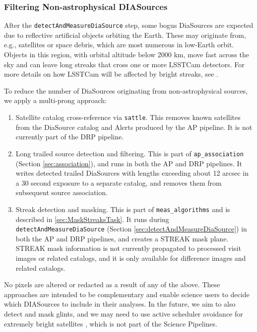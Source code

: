 \subsubsection{Filtering Non-astrophysical DIASources}
\label{sec:streaks}

After the \texttt{detectAndMeasureDiaSource} step, some bogus DiaSources are expected due to reflective artificial objects orbiting the Earth.
These may originate from, e.g., satellites or space debris, which are most numerous in low-Earth orbit.
Objects in this region, with orbital altitude below 2000 km, move fast across the sky and can leave long streaks that cross one or more LSSTCam detectors.
For more details on how LSSTCam will be affected by bright streaks, see \citet{2020AJ....160..226T,2022A&C....3900584H,2024SPIE13103E..1ZP,2024SPIE13103E..21S,2025arXiv250205418P}.

To reduce the number of DiaSources originating from non-astrophysical sources, we apply a multi-prong approach:

\begin{enumerate}
\item Satellite catalog cross-reference via \texttt{sattle}.
This removes known satellites from the DiaSource catalog and Alerts produced by the AP pipeline.
It is not currently part of the DRP pipeline.

\item Long trailed source detection and filtering.
This is part of \texttt{ap\_association} (Section \ref{sec:association}), and runs in both the AP and DRP pipelines.
It writes detected trailed DiaSources with lengths exceeding about 12 arcsec in a 30 second exposure to a separate catalog, and removes them from subsequent source association.

\item Streak detection and masking.
This is part of \texttt{meas\_algorithms} and is described in \ref{sec:MaskStreaksTask}.
It runs during \texttt{detectAndMeasureDiaSource} (Section \ref{sec:detectAndMeasureDiaSource}) in both the AP and DRP pipelines, and creates a STREAK mask plane.
STREAK mask information is not currently propagated to processed visit images or related catalogs, and it is only available for difference images and related catalogs.
\end{enumerate}

No pixels are altered or redacted as a result of any of the above.
These approaches are intended to be complementary and enable science users to decide which DIASources to include in their analyses.
In the future, we aim to also detect and mask glints, and we may need to use active scheduler avoidance for extremely bright satellites \citep{2022ApJ...941L..15H}, which is not part of the Science Pipelines.

